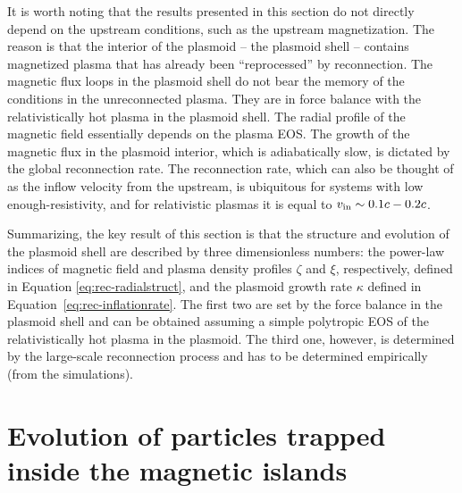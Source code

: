 It is worth noting that the results presented in this section do not directly depend on the upstream conditions, such as the upstream magnetization. The reason is that the interior of the plasmoid -- the plasmoid shell -- contains magnetized plasma that has already been ``reprocessed'' by reconnection. The magnetic flux loops in the plasmoid shell do not bear the memory of the conditions in the unreconnected plasma. They are in force balance with the relativistically hot plasma in the plasmoid shell. The radial profile of the magnetic field essentially depends on the plasma EOS. The growth of the magnetic flux in the plasmoid interior, which is adiabatically slow, is dictated by the global reconnection rate. The reconnection rate, which can also be thought of as the inflow velocity from the upstream, is ubiquitous for systems with low enough-resistivity, and for relativistic plasmas it is equal to $v_{\rm in}\sim 0.1c-0.2c$. 

Summarizing, the key result of this section is that the structure and evolution of the plasmoid shell are described by three dimensionless numbers: the power-law indices of magnetic field and plasma density profiles $\zeta$ and $\xi$, respectively, defined in Equation \eqref{eq:rec-radialstruct}, and the plasmoid growth rate $\kappa$ defined in Equation~\eqref{eq:rec-inflationrate}. The first two are set by the force balance in the plasmoid shell and can be obtained assuming a simple polytropic EOS of the relativistically hot plasma in the plasmoid. The third one, however, is determined by the large-scale reconnection process and has to be determined empirically (from the simulations).

%
% 
%
% 

\section{Evolution of particles trapped inside the magnetic islands}
\label{subsec:reconnection-particles_in_plasmoids}

